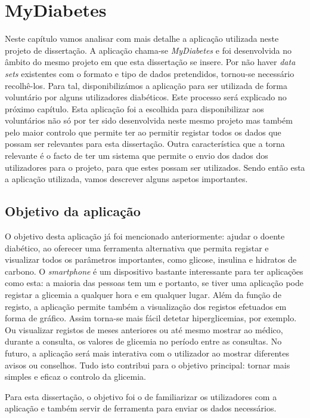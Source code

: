\chapter{MyDiabetes}\label{chap:syst}

Neste capítulo vamos analisar com mais detalhe a aplicação utilizada neste projeto de dissertação. A aplicação chama-se \textit{MyDiabetes} e foi desenvolvida no âmbito do mesmo projeto em que esta dissertação se insere. 
Por não haver \textit{data sets} existentes com o formato e tipo de dados pretendidos, tornou-se necessário recolhê-los. Para tal, disponibilizámos a aplicação para ser utilizada de forma voluntário por alguns utilizadores diabéticos. Este processo será explicado no próximo capítulo.
Esta aplicação foi a escolhida para disponibilizar aos voluntários não só por ter sido desenvolvida neste mesmo projeto mas também pelo maior controlo que permite ter ao permitir registar todos os dados que possam ser relevantes para esta dissertação. 
Outra característica que a torna relevante é o facto de ter um sistema que permite o envio dos dados dos utilizadores para o projeto, para que estes possam ser utilizados. Sendo então esta a aplicação utilizada, vamos descrever alguns aspetos importantes.


\section{Objetivo da aplicação}

O objetivo desta aplicação já foi mencionado anteriormente: ajudar o doente diabético, ao oferecer uma ferramenta alternativa que permita registar e visualizar todos os parâmetros importantes, como glicose, insulina e hidratos de carbono. O \textit{smartphone} é um dispositivo bastante interessante para ter aplicações como esta: a maioria das pessoas tem um e portanto, se tiver uma aplicação pode registar a glicemia a qualquer hora e em qualquer lugar.
Além da função de registo, a aplicação permite também a visualização dos registos efetuados em forma de gráfico. Assim torna-se mais fácil detetar hiperglicemias, por exemplo. Ou visualizar registos de meses anteriores ou até mesmo mostrar ao médico, durante a consulta, os valores de glicemia no período entre as consultas.
No futuro, a aplicação será mais interativa com o utilizador ao mostrar diferentes avisos ou conselhos. Tudo isto contribui para o objetivo principal: tornar mais simples e eficaz o controlo da glicemia. 

Para esta dissertação, o objetivo foi o de familiarizar os utilizadores com a aplicação e também servir de ferramenta para enviar os dados necessários.

